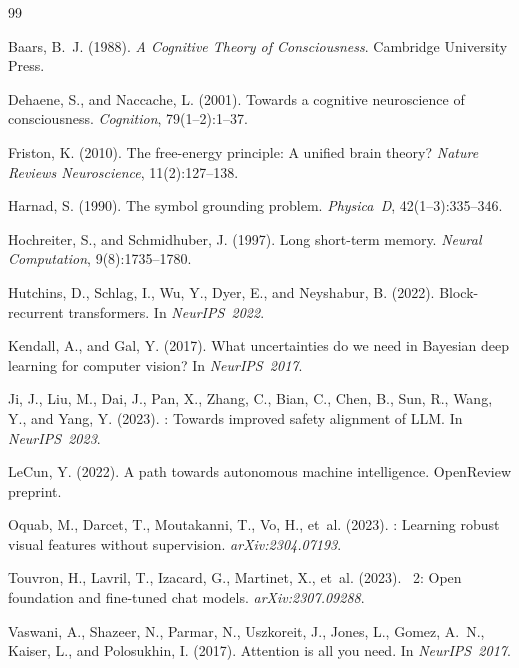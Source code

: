 \documentclass[12pt,a4paper]{article}
\begin{document}
\begin{thebibliography}{99}

Baars, B.~J. (1988).
\newblock \textit{A Cognitive Theory of Consciousness}.
\newblock Cambridge University Press.

Dehaene, S., and Naccache, L. (2001).
\newblock Towards a cognitive neuroscience of consciousness.
\newblock \textit{Cognition}, 79(1--2):1--37.

Friston, K. (2010).
\newblock The free-energy principle: A unified brain theory?
\newblock \textit{Nature Reviews Neuroscience}, 11(2):127--138.

Harnad, S. (1990).
\newblock The symbol grounding problem.
\newblock \textit{Physica~D}, 42(1--3):335--346.

Hochreiter, S., and Schmidhuber, J. (1997).
\newblock Long short-term memory.
\newblock \textit{Neural Computation}, 9(8):1735--1780.

Hutchins, D., Schlag, I., Wu, Y., Dyer, E., and Neyshabur, B. (2022).
\newblock Block-recurrent transformers.
\newblock In \textit{NeurIPS~2022}.

Kendall, A., and Gal, Y. (2017).
\newblock What uncertainties do we need in {B}ayesian deep learning for
  computer vision?
\newblock In \textit{NeurIPS~2017}.

Ji, J., Liu, M., Dai, J., Pan, X., Zhang, C., Bian, C., Chen, B., Sun, R.,
  Wang, Y., and Yang, Y. (2023).
: Towards improved safety alignment of {LLM}.
\newblock In \textit{NeurIPS~2023}.

LeCun, Y. (2022).
\newblock A path towards autonomous machine intelligence.
\newblock OpenReview preprint.

Oquab, M., Darcet, T., Moutakanni, T., Vo, H., et~al. (2023).
: Learning robust visual features without supervision.
\newblock \textit{arXiv:2304.07193}.

Touvron, H., Lavril, T., Izacard, G., Martinet, X., et~al. (2023).
~2: Open foundation and fine-tuned chat models.
\newblock \textit{arXiv:2307.09288}.

Vaswani, A., Shazeer, N., Parmar, N., Uszkoreit, J., Jones, L., Gomez, A.~N.,
  Kaiser, L., and Polosukhin, I. (2017).
\newblock Attention is all you need.
\newblock In \textit{NeurIPS~2017}.

\end{thebibliography}
\end{document}
